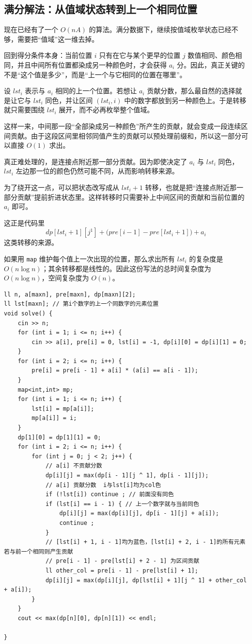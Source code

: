 \documentclass{book}
\newcommand{\code}[1]{\colorbox{codebg}{\texttt{#1}}}  %
\begin{document}
\subsection{满分解法：从值域状态转到上一个相同位置}

    现在已经有了一个 $O(nA)$ 的算法。满分数据下，继续按值域枚举状态已经不够，需要把“值域”这一维去掉。

    回到得分条件本身：当前位置 $i$ 只有在它与某个更早的位置 $j$ 数值相同、颜色相同，并且中间所有位置都染成另一种颜色时，才会获得 $a_i$ 分。因此，真正关键的不是“这个值是多少”，而是“上一个与它相同的位置在哪里”。

    设 $lst_i$ 表示与 $a_i$ 相同的上一个位置。若想让 $a_i$ 贡献分数，那么最自然的选择就是让它与 $lst_i$ 同色，并让区间 $(lst_i,i)$ 中的数字都放到另一种颜色上。于是转移就只需要围绕 $lst_i$ 展开，而不必再枚举整个值域。

    这样一来，中间那一段“全部染成另一种颜色”所产生的贡献，就会变成一段连续区间贡献。由于这段区间里相邻同值产生的贡献可以预处理前缀和，所以这一部分可以直接 $O(1)$ 求出。

    真正难处理的，是连接点附近那一部分贡献。因为即使决定了 $a_i$ 与 $lst_i$ 同色，$lst_i$ 左边那一位的颜色仍然可能不同，从而影响转移来源。
    
    为了绕开这一点，可以把状态改写成从 $lst_i+1$ 转移，也就是把“连接点附近那一部分贡献”提前折进状态里。这样转移时只需要补上中间区间的贡献和当前位置的 $a_i$ 即可。

    这正是代码里
    \[
    dp[lst_i+1][j^1] + \bigl(pre[i-1]-pre[lst_i+1]\bigr) + a_i
    \]
    这类转移的来源。

    如果用 \code{map} 维护每个值上一次出现的位置，那么求出所有 $lst_i$ 的复杂度是 $O(n\log n)$；其余转移都是线性的。因此这份写法的总时间复杂度为 $O(n\log n)$，空间复杂度为 $O(n)$。

\begin{lstlisting}[style = code]
ll n, a[maxn], pre[maxn], dp[maxn][2];
ll lst[maxn]; // 第i个数字的上一个同数字的元素位置
void solve() {
    cin >> n;
    for (int i = 1; i <= n; i++) {
        cin >> a[i], pre[i] = 0, lst[i] = -1, dp[i][0] = dp[i][1] = 0;
    }
    for (int i = 2; i <= n; i++) {
        pre[i] = pre[i - 1] + a[i] * (a[i] == a[i - 1]);
    }
    map<int,int> mp;
    for (int i = 1; i <= n; i++) {
        lst[i] = mp[a[i]];
        mp[a[i]] = i;
    }
    dp[1][0] = dp[1][1] = 0;
    for (int i = 2; i <= n; i++) {
        for (int j = 0; j < 2; j++) {
            // a[i] 不贡献分数
            dp[i][j] = max(dp[i - 1][j ^ 1], dp[i - 1][j]);
            // a[i] 贡献分数  i与lst[i]均为col色
            if (!lst[i]) continue ; // 前面没有同色
            if (lst[i] == i - 1) { // 上一个数字就与当前同色
                dp[i][j] = max(dp[i][j], dp[i - 1][j] + a[i]);
                continue ;
            }
            // [lst[i] + 1, i - 1]均为蓝色，[lst[i] + 2, i - 1]的所有元素若与前一个相同则产生贡献
            // pre[i - 1] - pre[lst[i] + 2 - 1] 为区间贡献
            ll other_col = pre[i - 1] - pre[lst[i] + 1];
            dp[i][j] = max(dp[i][j], dp[lst[i] + 1][j ^ 1] + other_col + a[i]);
        }
    }
    cout << max(dp[n][0], dp[n][1]) << endl;

}
    \end{lstlisting}
    
\end{document}
